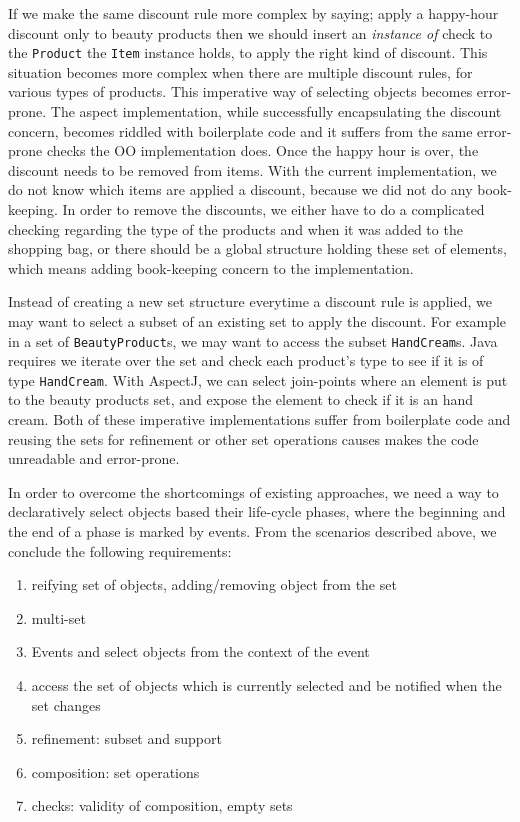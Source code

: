\documentclass{llncs}
\begin{document}
If we make the same discount rule more complex by saying; \textsf{apply a happy-hour discount only to beauty products} then we should insert an \emph{instance of} check to the \texttt{Product} the \texttt{Item} instance holds, to apply the right kind of discount. This situation becomes more complex when there are multiple discount rules, for various types of products. This imperative way of selecting objects becomes error-prone. The aspect implementation, while successfully encapsulating the discount concern, becomes riddled with boilerplate code and it suffers from the same error-prone checks the OO implementation does. Once the happy hour is over, the discount needs to be removed from items. With the current implementation, we do not know which items are applied a discount, because we did not do any book-keeping. In order to remove the discounts, we either have to do a complicated checking regarding the type of the products and when it was added to the shopping bag, or there should be a global structure holding these set of elements, which means adding book-keeping concern to the implementation. 

Instead of creating a new set structure everytime a discount rule is applied, we may want to select a subset of an existing set to apply the discount. For example in a set of \texttt{BeautyProduct}s, we may want to access the subset \texttt{HandCream}s. Java requires we iterate over the set and check each product's type to see if it is of type \texttt{HandCream}. With AspectJ, we can select join-points where an element is put to the beauty products set, and expose the element to check if it is an hand cream. Both of these imperative implementations suffer from boilerplate code and reusing the sets for refinement or other set operations causes makes the code unreadable and error-prone.


In order to overcome the shortcomings of existing approaches, we need a way to declaratively select objects based their life-cycle phases, where the beginning and the end of a phase is marked by events. From the scenarios described above, we conclude the following requirements:

\begin{enumerate}[{Requirement}1{:}]
\item reifying set of objects, adding/removing object from the set
\item multi-set
\item Events and select objects from the context of the event
\item access the set of objects which is currently selected and be notified when the set changes
\item refinement: subset and support
\item composition: set operations
\item checks: validity of composition, empty sets
\end{enumerate}
\end{document}
